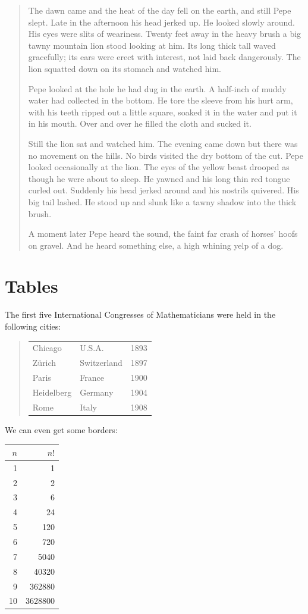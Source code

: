 \documentclass[a4paper,12pt,titlepage]{article}
\begin{document}
\begin{quotation}
The dawn came and the heat of the day fell on the earth, and still Pepe slept.
Late in the afternoon his head jerked up. He looked slowly around. His eyes
were slits of weariness. Twenty feet away in the heavy brush a big tawny
mountain lion stood looking at him. Its long thick tall waved gracefully; its
ears were erect with interest, not laid back dangerously. The lion squatted
down on its stomach and watched him.

Pepe looked at the hole he had dug in the earth. A half-inch of muddy water had
collected in the bottom. He tore the sleeve from his hurt arm, with his teeth
ripped out a little square, soaked it in the water and put it in his mouth.
Over and over he filled the cloth and sucked it.

Still the lion sat and watched him. The evening came down but there was no
movement on the hills. No birds visited the dry bottom of the cut. Pepe looked
occasionally at the lion. The eyes of the yellow beast drooped as though he
were about to sleep. He yawned and his long thin red tongue curled out.
Suddenly his head jerked around and his nostrils quivered. His big tail lashed.
He stood up and slunk like a tawny shadow into the thick brush.

A moment later Pepe heard the sound, the faint far crash of horses' hoofs on
gravel. And he heard something else, a high whining yelp of a dog.
\end{quotation}

\section*{Tables}

The first five International Congresses of Mathematicians
were held in the following cities:
\begin{quote}
\begin{tabular}{lll}
Chicago&U.S.A.&1893\\
Z\"{u}rich&Switzerland&1897\\
Paris&France&1900\\
Heidelberg&Germany&1904\\
Rome&Italy&1908
\end{tabular}
\end{quote}

We can even get some borders:

\begin{tabular}{|r|r|}
\hline
$n$&$n!$\\
\hline
1&1\\
2&2\\
3&6\\
4&24\\
5&120\\
6&720\\
7&5040\\
8&40320\\
9&362880\\
10&3628800\\
\hline
\end{tabular}
\end{document}
